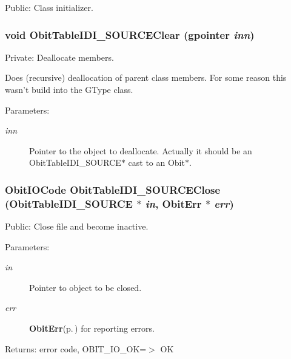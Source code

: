 Public: Class initializer. 

\subsubsection{\setlength{\rightskip}{0pt plus 5cm}void Obit\-Table\-IDI\_\-SOURCEClear (gpointer {\em inn})}\label{ObitTableIDI__SOURCE_8c_a9}


Private: Deallocate members. 

Does (recursive) deallocation of parent class members. For some reason this wasn't build into the GType class. \begin{Desc}
\item[Parameters:]
\begin{description}
\item[{\em inn}]Pointer to the object to deallocate. Actually it should be an Obit\-Table\-IDI\_\-SOURCE$\ast$ cast to an Obit$\ast$. \end{description}
\end{Desc}
\subsubsection{\setlength{\rightskip}{0pt plus 5cm}Obit\-IOCode Obit\-Table\-IDI\_\-SOURCEClose ({\bf Obit\-Table\-IDI\_\-SOURCE} $\ast$ {\em in}, {\bf Obit\-Err} $\ast$ {\em err})}\label{ObitTableIDI__SOURCE_8c_a25}


Public: Close file and become inactive. 

\begin{Desc}
\item[Parameters:]
\begin{description}
\item[{\em in}]Pointer to object to be closed. \item[{\em err}]{\bf Obit\-Err}{\rm (p.\,\pageref{structObitErr})} for reporting errors. \end{description}
\end{Desc}
\begin{Desc}
\item[Returns:]error code, OBIT\_\-IO\_\-OK=$>$ OK \end{Desc}
